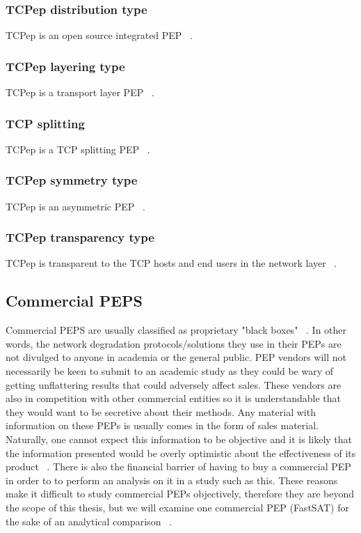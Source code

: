 \subsubsection*{TCPep distribution type}
TCPep is an open source integrated PEP ~\cite{33}. 

\subsubsection*{TCPep layering type}
TCPep is a transport layer PEP ~\cite{33}.

\subsubsection*{TCP splitting}
TCPep is a TCP splitting PEP ~\cite{33}.

\subsubsection*{TCPep symmetry type}
TCPep is an asymmetric PEP ~\cite{33}.

\subsubsection*{TCPep transparency type}
TCPep is transparent to the TCP hosts and end users in the network layer ~\cite{33}. 

\subsection{Commercial PEPS} 
Commercial PEPS are usually classified as proprietary "black boxes" ~\cite{6}. In other words, the network degradation protocols/solutions they use in their PEPs are not divulged to anyone in academia or the general public. PEP vendors will not necessarily be keen to submit to an academic study as they could be wary of getting unflattering results that could adversely affect sales. These vendors are also in competition with other commercial entities so it is understandable that they would want to be secretive about their methods. Any material with information on these PEPs is usually comes in the form of sales material. Naturally, one cannot expect this information to be objective and it is likely that the information presented would be overly optimistic about the effectiveness of its product ~\cite{6}. There is also the financial barrier of having to buy a commercial PEP in order to to perform an analysis on it in a study such as this. These reasons make it difficult to study commercial PEPs objectively, therefore they are beyond the scope of this thesis, but we will examine one commercial PEP (FastSAT) for the sake of an analytical comparison ~\cite{34}.\\

